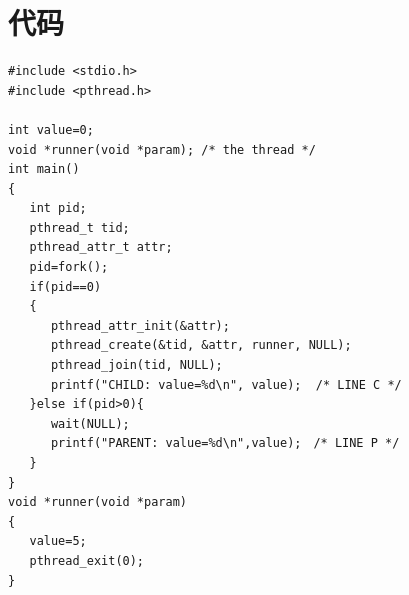 \documentclass[
	12pt, %
	cn, %
]{mwhw2}
\begin{document}
\section{代码}
\begin{lstlisting}
#include <stdio.h>
#include <pthread.h>

int value=0;
void *runner(void *param); /* the thread */
int main()
{
   int pid;
   pthread_t tid;
   pthread_attr_t attr;
   pid=fork();
   if(pid==0)
   {
      pthread_attr_init(&attr);
      pthread_create(&tid, &attr, runner, NULL);
      pthread_join(tid, NULL);
      printf("CHILD: value=%d\n", value);  /* LINE C */
   }else if(pid>0){
      wait(NULL);
      printf("PARENT: value=%d\n",value);　/* LINE P */
   }
}
void *runner(void *param)
{
   value=5;
   pthread_exit(0);
}
\end{lstlisting}
\end{document}
